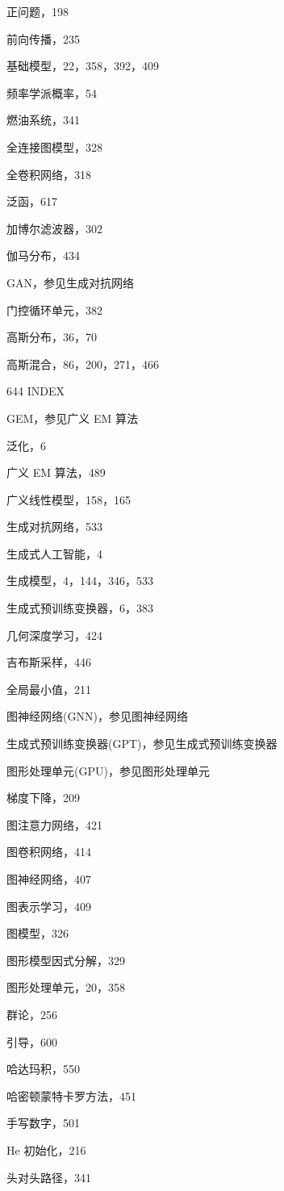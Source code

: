 \documentclass[10pt]{article}
\begin{document}
正问题，198

前向传播，235

基础模型，22，358，392，409

频率学派概率，54

燃油系统，341

全连接图模型，328

全卷积网络，318

泛函，617

加博尔滤波器，302

伽马分布，434

GAN，参见生成对抗网络

门控循环单元，382

高斯分布，36，70

高斯混合，86，200，271，466

644 INDEX

GEM，参见广义 EM 算法

泛化，6

广义 EM 算法，489

广义线性模型，158，165

生成对抗网络，533

生成式人工智能，4

生成模型，4，144，346，533

生成式预训练变换器，6，383

几何深度学习，424

吉布斯采样，446

全局最小值，211

图神经网络(GNN)，参见图神经网络

生成式预训练变换器(GPT)，参见生成式预训练变换器

图形处理单元(GPU)，参见图形处理单元

梯度下降，209

图注意力网络，421

图卷积网络，414

图神经网络，407

图表示学习，409

图模型，326

图形模型因式分解，329

图形处理单元，20，358

群论，256

引导，600

哈达玛积，550

哈密顿蒙特卡罗方法，451

手写数字，501

He 初始化，216

头对头路径，341
\end{document}
